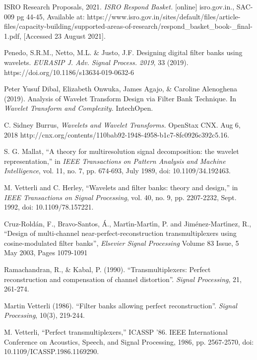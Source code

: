 \begin{thebibliography}{}
ISRO Research Proposals, 2021. \textit{ISRO Respond Basket.} [online] isro.gov.in., SAC-009 pg 44-45, Available at: https://www.isro.gov.in/sites/default/files/article-files/capacity-building/supported-areas-of-research/respond\_basket\_book-\_final-1.pdf, [Accessed 23 August 2021].

Penedo, S.R.M., Netto, M.L. \& Justo, J.F. Designing digital filter banks using wavelets. \textit{EURASIP J. Adv. Signal Process. 2019}, 33 (2019). https://doi.org/10.1186/s13634-019-0632-6

Peter Yusuf Dibal, Elizabeth Onwuka, James Agajo, \& Caroline Alenoghena (2019). Analysis of Wavelet Transform Design via Filter Bank Technique. In \textit{Wavelet Transform and Complexity.} IntechOpen.

C. Sidney Burrus, \textit{Wavelets and Wavelet Transforms.} OpenStax CNX. Aug 6, 2018 http://cnx.org/contents/110bab92-1948-4958-b1c7-8fc0926c392c\@5.16. 

S. G. Mallat, ``A theory for multiresolution signal decomposition: the wavelet representation,'' in \textit{IEEE Transactions on Pattern Analysis and Machine Intelligence}, vol. 11, no. 7, pp. 674-693, July 1989, doi: 10.1109/34.192463.

M. Vetterli and C. Herley, ``Wavelets and filter banks: theory and design,'' in \textit{IEEE Transactions on Signal Processing}, vol. 40, no. 9, pp. 2207-2232, Sept. 1992, doi: 10.1109/78.157221.

Cruz-Roldán, F., Bravo-Santos, Á., Martı́n-Martı́n, P. and Jiménez-Martı́nez, R., ``Design of multi-channel near-perfect-reconstruction transmultiplexers using cosine-modulated filter banks'', \textit{Elsevier Signal Processing} Volume 83 Issue, 5 May 2003, Pages 1079-1091

Ramachandran, R., \& Kabal, P. (1990). ``Transmultiplexers: Perfect reconstruction and compensation of channel distortion''. \textit{Signal Processing}, 21, 261-274.

Martin Vetterli (1986). ``Filter banks allowing perfect reconstruction''. \textit{Signal Processing}, 10(3), 219-244.

M. Vetterli, ``Perfect transmultiplexers,'' ICASSP '86. IEEE International Conference on Acoustics, Speech, and Signal Processing, 1986, pp. 2567-2570, doi: 10.1109/ICASSP.1986.1169290.


\end{thebibliography}
